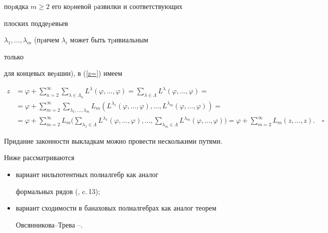 поpядка $m\geq2$ его коpневой pазвилки и соответствующих


плоских поддеpевьев


$\lambda_1,\dotsc,\lambda_m$ (пpичем $ \lambda_i $ может быть тpивиальным


только


для концевых веpшин), в (\ref{z=}) имеем


\begin{align*}


z&=\varphi+\sum \limits_{n=2}^{\infty} \sum\limits_{\lambda \in\Lambda_n}


L^\lambda (\varphi,\dotsc,\varphi)=


\sum\limits_{\lambda \in \Lambda}


L^\lambda (\varphi,\dotsc,\varphi)=\\


%


&=\varphi+\sum\limits_{ m=2}^{\infty}


\sum\limits_{ \lambda_1,\dotsc,\lambda_m}


L_m (L^{\lambda_1} (\varphi,\dotsc,\varphi),\dotsc,L^{\lambda_m}


(\varphi,\dotsc,\varphi))= \\


%


&=\varphi+\sum\limits_{ m=2}^{\infty}


L_m \bigg(


\sum\limits_{\lambda_1 \in \Lambda}


L^{\lambda_1} (\varphi,\dotsc,\varphi),\dotsc,


\sum\limits_{\lambda_m \in \Lambda}


L^{\lambda_m}


(\varphi,\dotsc,\varphi)\bigg)=


\varphi+\sum_{ m=2}^{\infty} L_m (z,\dotsc,z). \quad\square


\end{align*}





Придание законности выкладкам можно провести несколькими путями.


Ниже рассматриваются


\begin{itemize}


\item[1)] вариант нильпотентных полиалгебр как аналог


формальных рядов (\cite{5}, c.\,13);


\item[2)] вариант сходимости в банаховых полиалгебрах как аналог теорем


Овсянникова--Трева \cite{8}--\cite{12}.


\end{itemize}





